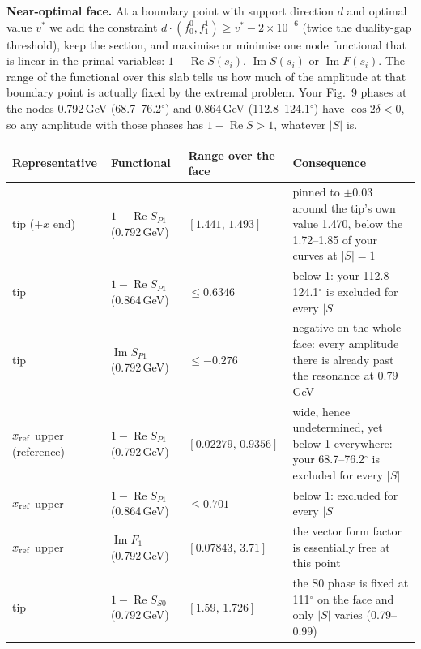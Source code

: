 \documentclass[11pt,a4paper]{article}
\begin{document}
\textbf{Near-optimal face.} At a boundary point with support direction $d$ and optimal value $v^*$ we add the constraint $d\cdot(f_0^0,f_1^1)\ge v^*-2\times10^{-6}$ (twice the duality-gap threshold), keep the section, and maximise or minimise one node functional that is linear in the primal variables: $1-\operatorname{Re}S(s_i)$, $\operatorname{Im}S(s_i)$ or $\operatorname{Im}F(s_i)$. The range of the functional over this slab tells us how much of the amplitude at that boundary point is actually fixed by the extremal problem. Your Fig.~9 phases at the nodes 0.792\,GeV (68.7--76.2$^\circ$) and 0.864\,GeV (112.8--124.1$^\circ$) have $\cos2\delta<0$, so any amplitude with those phases has $1-\operatorname{Re}S>1$, whatever $|S|$ is.

\begin{table}[H]\small\begin{tabularx}{\textwidth}{@{}P{0.17\textwidth}P{0.2\textwidth}P{0.17\textwidth}Y@{}}\toprule Representative & Functional & Range over the face & Consequence \\\midrule
tip ($+x$ end) & $1-\operatorname{Re}S_{P1}$ (0.792\,GeV) & $[1.441,\,1.493]$ & pinned to $\pm0.03$ around the tip's own value 1.470, below the 1.72--1.85 of your curves at $|S|=1$ \\
tip & $1-\operatorname{Re}S_{P1}$ (0.864\,GeV) & $\le 0.6346$ & below 1: your 112.8--124.1$^\circ$ is excluded for every $|S|$ \\
tip & $\operatorname{Im}S_{P1}$ (0.792\,GeV) & $\le \ensuremath{-0.276}$ & negative on the whole face: every amplitude there is already past the resonance at 0.79\,GeV \\
$x_{\rm ref}$ upper (reference) & $1-\operatorname{Re}S_{P1}$ (0.792\,GeV) & $[0.02279,\,0.9356]$ & wide, hence undetermined, yet below 1 everywhere: your 68.7--76.2$^\circ$ is excluded for every $|S|$ \\
$x_{\rm ref}$ upper & $1-\operatorname{Re}S_{P1}$ (0.864\,GeV) & $\le 0.701$ & below 1: excluded for every $|S|$ \\
$x_{\rm ref}$ upper & $\operatorname{Im}F_1$ (0.792\,GeV) & $[0.07843,\,3.71]$ & the vector form factor is essentially free at this point \\
tip & $1-\operatorname{Re}S_{S0}$ (0.792\,GeV) & $[1.59,\,1.726]$ & the S0 phase is fixed at 111$^\circ$ on the face and only $|S|$ varies (0.79--0.99) \\\bottomrule\end{tabularx}\end{table}
\end{document}

